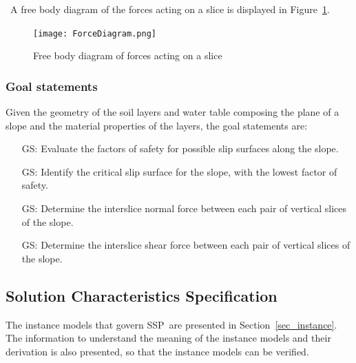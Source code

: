 \documentclass[12pt]{article}
\newcommand{\progname}{SSP}
\newcounter{goalnum} %
\begin{document}
~\newline\noindent A free body diagram of the forces acting on a
slice is displayed in Figure~\ref{Fig_Forces}.

\begin{figure}[h!]
\begin{center}
{
 \texttt{[image: ForceDiagram.png]}
}
\caption{Free body diagram of forces acting on a slice}
\label{Fig_Forces}
\end{center}
\end{figure}

\subsubsection{Goal statements} \label{sec_Goals}

Given the geometry of the soil layers and water table composing the plane of a 
slope and the material properties of the layers, the goal statements are:

\begin{itemize}
\item [GS\refstepcounter{goalnum}\thegoalnum: \label{G_FS}]
  {Evaluate the factors of safety for possible slip surfaces along the slope.}
  
\item [GS\refstepcounter{goalnum}\thegoalnum: \label{G_Critical}]
  {Identify the critical slip surface for the slope, with the lowest factor of 
  safety.}

\item [GS\refstepcounter{goalnum}\thegoalnum: \label{G_Normal}]
  {Determine the interslice normal force between each pair of vertical slices   
  of the slope.}
  
\item [GS\refstepcounter{goalnum}\thegoalnum: \label{G_Shear}]
  {Determine the interslice shear force between each pair of vertical slices of 
  the slope.} 
\end{itemize}

\subsection{Solution Characteristics Specification}

The instance models that govern \progname\ are presented in
Section~\ref{sec_instance}.  The information to understand the
meaning of the instance models and their derivation is also presented,
so that the instance models can be verified.
\end{document}
